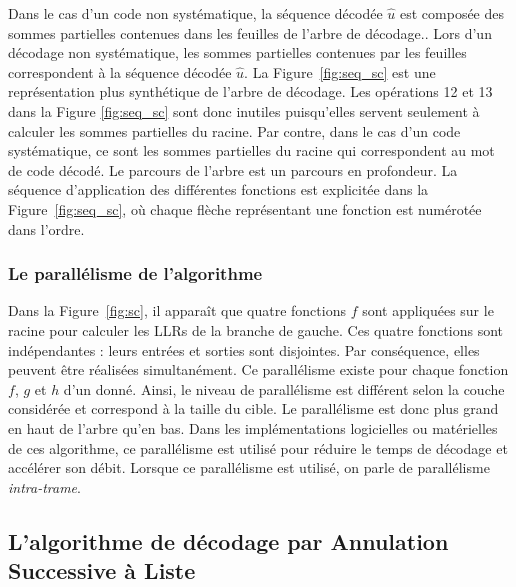 Dans le cas d'un code non systématique, la séquence décodée $\hat{u}$ est composée des sommes partielles contenues dans les feuilles de l'arbre de décodage..
Lors d'un décodage non systématique, les sommes partielles contenues par les feuilles correspondent à la séquence décodée $\hat{u}$.
La Figure~\ref{fig:seq_sc} est une représentation plus synthétique de l'arbre de décodage.
Les opérations 12 et 13 dans la Figure \ref{fig:seq_sc} sont donc inutiles puisqu'elles servent seulement à calculer les sommes partielles du \noeud racine.
Par contre, dans le cas d'un code systématique, ce sont les sommes partielles du \noeud racine qui correspondent au mot de code décodé.
Le parcours de l'arbre est un parcours en profondeur.
La séquence d'application des différentes fonctions est explicitée dans la Figure~\ref{fig:seq_sc}, où chaque flèche représentant une fonction est numérotée dans l'ordre.



\subsubsection{Le parallélisme de l'algorithme}
Dans la Figure~\ref{fig:sc}, il apparaît que quatre fonctions $f$ sont appliquées sur le \noeud racine pour calculer les LLRs de la branche de gauche. Ces quatre fonctions sont indépendantes : leurs entrées et sorties sont disjointes. Par conséquence, elles peuvent être réalisées simultanément. Ce parallélisme existe pour chaque fonction $f$, $g$ et $h$ d'un \noeud donné. Ainsi, le niveau de parallélisme est différent selon la couche considérée et correspond à la taille du \noeud cible. Le parallélisme est donc plus grand en haut de l'arbre qu'en bas. Dans les implémentations logicielles ou matérielles de ces algorithme, ce parallélisme est utilisé pour réduire le temps de décodage et accélérer son débit. Lorsque ce parallélisme est utilisé, on parle de parallélisme \textit{intra-trame}.


\subsection{L'algorithme de décodage par Annulation Successive à Liste}

